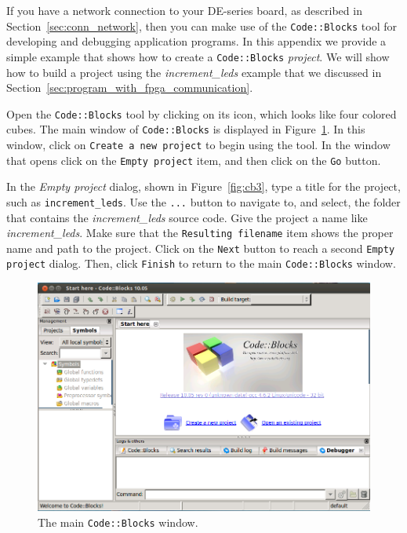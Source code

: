 \documentclass[11pt, twoside, pdftex]{article}
\begin{document}
If you have a network connection to your DE-series board, as described in
Section~\ref{sec:conn_network}, then you can make use of the \texttt{Code::Blocks} tool for
developing and debugging application programs. In this appendix we provide a simple example 
that shows how to create a \texttt{Code::Blocks} {\it project}.
We will show how to build a project using the {\it increment\_leds} example that we discussed in
Section~\ref{sec:program_with_fpga_communication}.

Open the \texttt{Code::Blocks} tool by clicking on its icon, which looks like four colored
cubes. The main window of \texttt{Code::Blocks} is displayed in Figure~\ref{fig:cb1}. In this
window, click on \texttt{Create a new project} to begin using the tool. In the window that
opens click on the \texttt{Empty project} item, and then click on the \texttt{Go} button.

In the {\it Empty project} dialog, shown in Figure~\ref{fig:cb3}, type a title for the
project, such as \texttt{increment\_leds}. Use the \texttt{...} button to navigate to, and
select, the folder that contains the {\it increment\_leds} source code. Give the project a
name like {\it increment\_leds}. Make sure that the \texttt{Resulting filename} item shows 
the proper name and path to the project. Click on the \texttt{Next} button to reach a
second \texttt{Empty project} dialog. Then, click \texttt{Finish} to return to the main
\texttt{Code::Blocks} window.

\begin{figure} [h]
\begin{center}
\includegraphics[scale = .60]{figures/cb1.png}
\end{center}
\caption{The main \texttt{Code::Blocks} window.}
\label{fig:cb1}
\end{figure}
\end{document}
